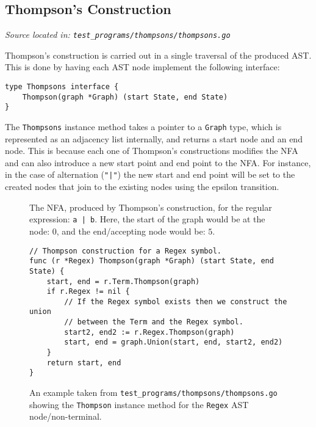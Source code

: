 \subsection{Thompson's Construction}
\cprotect\textit{Source located in: \verb|test_programs/thompsons/thompsons.go|}

Thompson's construction is carried out in a single traversal of the produced AST. This is done by having each AST node implement the following interface:

\begin{verbatim}
type Thompsons interface {
    Thompson(graph *Graph) (start State, end State)
}
\end{verbatim}

The \verb|Thompsons| instance method takes a pointer to a \verb|Graph| type, which is represented as an adjacency list internally, and returns a start node and an end node. This is because each one of Thompson's constructions modifies the NFA and can also introduce a new start point and end point to the NFA. For instance, in the case of alternation (\verb+"|"+) the new start and end point will be set to the created nodes that join to the existing nodes using the epsilon transition.

\begin{figure}[!h]
    \centering
    \cprotect\caption{The NFA, produced by Thompson's construction, for the regular expression: \verb+a | b+. Here, the start of the graph would be at the node: $0$, and the end/accepting node would be: $5$.}
\end{figure}

\begin{figure}[H]
    \begin{verbatim}
// Thompson construction for a Regex symbol.
func (r *Regex) Thompson(graph *Graph) (start State, end State) {
    start, end = r.Term.Thompson(graph)
    if r.Regex != nil {
        // If the Regex symbol exists then we construct the union
        // between the Term and the Regex symbol.
        start2, end2 := r.Regex.Thompson(graph)
        start, end = graph.Union(start, end, start2, end2)
    }
    return start, end
}
    \end{verbatim}
    \cprotect\caption{An example taken from \verb|test_programs/thompsons/thompsons.go| showing the \verb|Thompson| instance method for the \verb|Regex| AST node/non-terminal.}
\end{figure}

